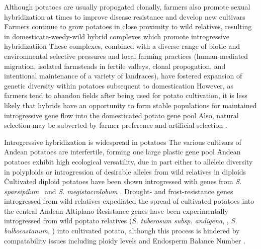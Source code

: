 \documentclass[11pt]{article}
\begin{document}
Although potatoes are usually propogated clonally, farmers also promote sexual hybridization at times to improve disease resistance and develop new cultivars \cite{quiros1992increase}\.
Farmers continue to grow potatoes in close proximity to wild relatives, resulting in domesticate-weedy-wild hybrid complexes which promote introgressive hybridizatiion \cite{rabinowitz1990high, johns1987relationships, linder1987diversity}\.
These complexes, combined with a diverse range of biotic and environmental selective pressures and local farming practices (human-mediated migration, isolated farmsteads in fertile valleys, clonal propogation, and intentional maintenance of a variety of landraces), have fostered expansion of genetic diversity within potatoes subsequent to domestication \cite{brush1995potato}\.
However, as farmers tend to abandon fields after being used for potato cultivation, it is less likely that hybrids have an opportunity to form stable populations for maintained introgressive gene flow into the domesticated potato gene pool \cite{brush1995potato}\.
Also, natural selection may be subverted by farmer preference and artificial selection \cite{brush1981dynamics}.

Introgressive hybridization is widespread in potatoes \cite{grun1990evolution}\.
The various cultivars of Andean potatoes are interfertile, forming one large plastic gene pool \cite{quiros1992increase}\.
Andean potatoes exhibit high ecological versatility, due in part either to alleleic diversity in polyploids or introgression of desirable alleles from wild relatives in diploids \cite{zimmerer1998ecogeography}\.
Cultivated diploid potatoes have been shown introgressed with genes from \emph{S. sparsipilum} \cite{rabinowitz1990high}\ and \emph{S. megistacrolobum} \cite{johns1987relationships, huaman1980solanum}.
Drought- and frost-resistance genes introgressed from wild relatives expediated the spread of cultivated potatoes into the central Andean Altiplano \cite{johns1986ongoing, hawkes1962origin, schmiediche1980breeding}\.
Resistance genes have been experimentally introgressed from wild poptato relatives (\emph{S. tuberosum subsp. andigena}, \cite{van1999tight}, \emph{S. bulbocastanum}, \cite{van2003ancient}) into cultivated potato, although this process is hindered by compatability issues including ploidy levels and Endosperm Balance Number \cite{johnston1980significance}.
\end{document}
